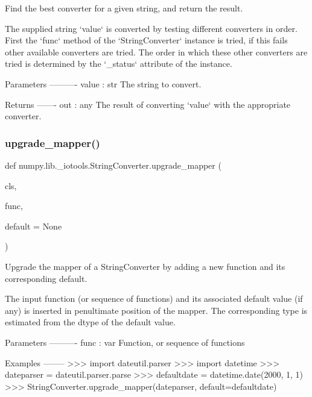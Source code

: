 \begin{DoxyVerb}Find the best converter for a given string, and return the result.

The supplied string `value` is converted by testing different
converters in order. First the `func` method of the
`StringConverter` instance is tried, if this fails other available
converters are tried.  The order in which these other converters
are tried is determined by the `_status` attribute of the instance.

Parameters
----------
value : str
    The string to convert.

Returns
-------
out : any
    The result of converting `value` with the appropriate converter.\end{DoxyVerb}
 \mbox{\label{classnumpy_1_1lib_1_1__iotools_1_1StringConverter_abbd532192cd492cab583763380d132d6}} 
\subsubsection{\texorpdfstring{upgrade\+\_\+mapper()}{upgrade\_mapper()}}
{\footnotesize\ttfamily def numpy.\+lib.\+\_\+iotools.\+String\+Converter.\+upgrade\+\_\+mapper (\begin{DoxyParamCaption}\item[{}]{cls,  }\item[{}]{func,  }\item[{}]{default = {\ttfamily None} }\end{DoxyParamCaption})}

\begin{DoxyVerb}Upgrade the mapper of a StringConverter by adding a new function and
its corresponding default.

The input function (or sequence of functions) and its associated
default value (if any) is inserted in penultimate position of the
mapper.  The corresponding type is estimated from the dtype of the
default value.

Parameters
----------
func : var
    Function, or sequence of functions

Examples
--------
>>> import dateutil.parser
>>> import datetime
>>> dateparser = dateutil.parser.parse
>>> defaultdate = datetime.date(2000, 1, 1)
>>> StringConverter.upgrade_mapper(dateparser, default=defaultdate)
\end{DoxyVerb}
 

